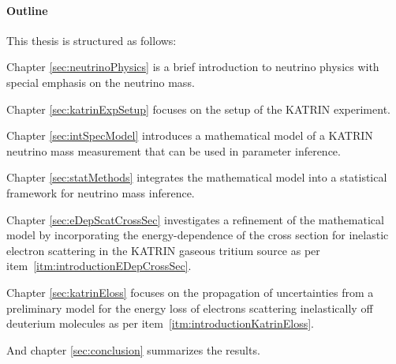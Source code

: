 \paragraph{Outline}
This thesis is structured as follows:

Chapter \ref{sec:neutrinoPhysics} is a brief introduction to neutrino physics with special emphasis on the neutrino mass.

Chapter \ref{sec:katrinExpSetup} focuses on the setup of the KATRIN experiment.

Chapter \ref{sec:intSpecModel} introduces a mathematical model of a KATRIN neutrino mass measurement that can be used in parameter inference.

Chapter \ref{sec:statMethods} integrates the mathematical model into a statistical framework for neutrino mass inference.

Chapter \ref{sec:eDepScatCrossSec} investigates a refinement of the mathematical model by incorporating the energy-dependence of the cross section for inelastic electron scattering in the KATRIN gaseous tritium source as per item~\ref{itm:introductionEDepCrossSec}.

Chapter \ref{sec:katrinEloss} focuses on the propagation of uncertainties from a preliminary model for the energy loss of electrons scattering inelastically off deuterium molecules as per item~\ref{itm:introductionKatrinEloss}.

And chapter \ref{sec:conclusion} summarizes the results.